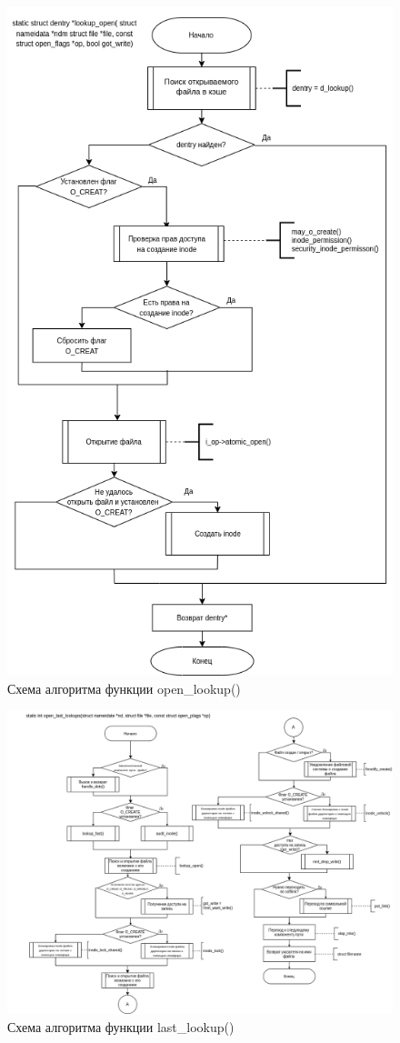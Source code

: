 \begin{figure}[H]
	\centering
	\includegraphics[scale=0.6]{assets/open-lookup_open.drawio.png}
	\caption{Схема алгоритма функции open\_lookup()}
\end{figure}

\begin{figure}[H]
	\centering
	\includegraphics[scale=0.45]{assets/open-open_last_lookups.drawio.png}
	\caption{Схема алгоритма функции last\_lookup()}
\end{figure}